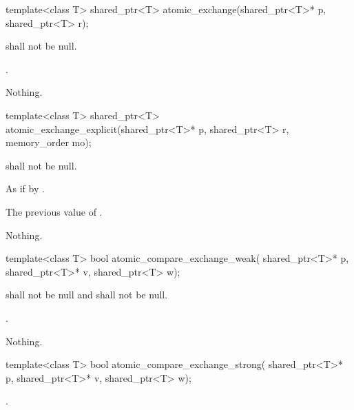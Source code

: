 %
\begin{itemdecl}
template<class T>
  shared_ptr<T> atomic_exchange(shared_ptr<T>* p, shared_ptr<T> r);
\end{itemdecl}

\begin{itemdescr}
\pnum
\requires {} shall not be null.

\pnum
\returns {}.

\pnum
\throws Nothing.
\end{itemdescr}

%
\begin{itemdecl}
template<class T>
  shared_ptr<T> atomic_exchange_explicit(shared_ptr<T>* p, shared_ptr<T> r,
                                         memory_order mo);
\end{itemdecl}

\begin{itemdescr}
\pnum
\requires {} shall not be null.

\pnum
\effects As if by .

\pnum
\returns The previous value of .

\pnum
\throws Nothing.
\end{itemdescr}

%
\begin{itemdecl}
template<class T>
  bool atomic_compare_exchange_weak(
    shared_ptr<T>* p, shared_ptr<T>* v, shared_ptr<T> w);
\end{itemdecl}

\begin{itemdescr}
\pnum
\requires {} shall not be null and  shall not be null.

\pnum
\returns {}.

\pnum
\throws Nothing.
\end{itemdescr}

%
\begin{itemdecl}
template<class T>
  bool atomic_compare_exchange_strong(
    shared_ptr<T>* p, shared_ptr<T>* v, shared_ptr<T> w);
\end{itemdecl}

\begin{itemdescr}
\pnum
\returns {}
.
\end{itemdescr}

